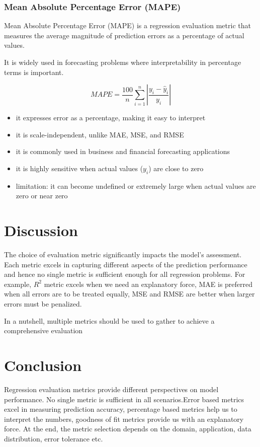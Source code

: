 \documentclass{article}
\begin{document}
    \subsubsection{Mean Absolute Percentage Error (MAPE)}

Mean Absolute Percentage Error (MAPE) is a regression evaluation metric that measures the average magnitude of prediction errors as a percentage of actual values.

It is widely used in forecasting problems where interpretability in percentage terms is important.

\begin{equation}
    MAPE = \frac{100}{n} \sum_{i=1}^{n} \left| \frac{y_i - \hat{y}_i}{y_i} \right|
\end{equation}

\begin{itemize}
    \item it expresses error as a percentage, making it easy to interpret
    \item it is scale-independent, unlike MAE, MSE, and RMSE
    \item it is commonly used in business and financial forecasting applications
    \item it is highly sensitive when actual values ($y_i$) are close to zero
    \item limitation: it can become undefined or extremely large when actual values are zero or near zero
\end{itemize}

\section{Discussion}
    The choice of evaluation metric significantly impacts the model's assessment. Each metric excels in capturing different aspects of the prediction performance and hence no single metric is sufficient enough for all regression problems.
    For example, $R^2$ metric excels when we need an explanatory force, MAE is preferred when all errors are to be treated equally, MSE and RMSE are better when larger errors must be penalized.   

    In a nutshell, multiple metrics should be used to gather to achieve a comprehensive evaluation

    \section{Conclusion}
    Regression evaluation metrics provide different perspectives on model performance. No single metric is sufficient in all scenarios.Error based metrics excel in measuring prediction accuracy, percentage based metrics help us to interpret the numbers, goodness of fit metrics provide us with an explanatory force. At the end, the metric selection depends on the domain, application, data distribution, error tolerance etc.
\end{document}
